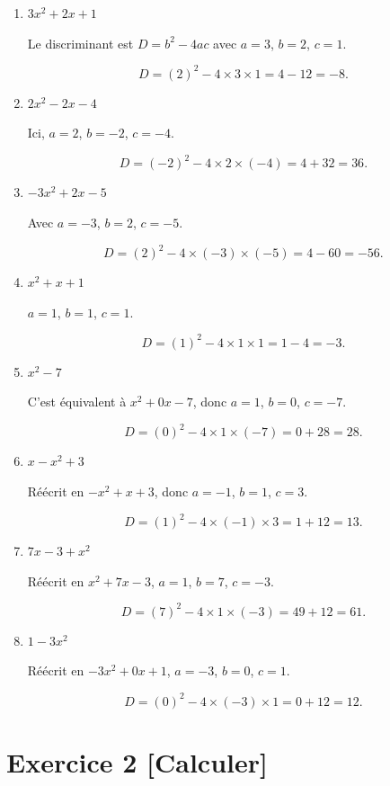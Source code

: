 \documentclass{article}
\begin{document}
\begin{enumerate}
    \item $3x^2 + 2x + 1$

    Le discriminant est $D = b^2 - 4ac$ avec $a = 3$, $b = 2$, $c = 1$.

    \[
    D = (2)^2 - 4 \times 3 \times 1 = 4 - 12 = -8.
    \]

    \item $2x^2 - 2x - 4$

    Ici, $a = 2$, $b = -2$, $c = -4$.

    \[
    D = (-2)^2 - 4 \times 2 \times (-4) = 4 + 32 = 36.
    \]

    \item $-3x^2 + 2x - 5$

    Avec $a = -3$, $b = 2$, $c = -5$.

    \[
    D = (2)^2 - 4 \times (-3) \times (-5) = 4 - 60 = -56.
    \]

    \item $x^2 + x + 1$

    $a = 1$, $b = 1$, $c = 1$.

    \[
    D = (1)^2 - 4 \times 1 \times 1 = 1 - 4 = -3.
    \]

    \item $x^2 - 7$

    C'est équivalent à $x^2 + 0x - 7$, donc $a = 1$, $b = 0$, $c = -7$.

    \[
    D = (0)^2 - 4 \times 1 \times (-7) = 0 + 28 = 28.
    \]

    \item $x - x^2 + 3$

    Réécrit en $-x^2 + x + 3$, donc $a = -1$, $b = 1$, $c = 3$.

    \[
    D = (1)^2 - 4 \times (-1) \times 3 = 1 + 12 = 13.
    \]

    \item $7x - 3 + x^2$

    Réécrit en $x^2 + 7x - 3$, $a = 1$, $b = 7$, $c = -3$.

    \[
    D = (7)^2 - 4 \times 1 \times (-3) = 49 + 12 = 61.
    \]

    \item $1 - 3x^2$

    Réécrit en $-3x^2 + 0x + 1$, $a = -3$, $b = 0$, $c = 1$.

    \[
    D = (0)^2 - 4 \times (-3) \times 1 = 0 + 12 = 12.
    \]
\end{enumerate}

\section*{Exercice 2 \textbf{[Calculer]}}
\end{document}

